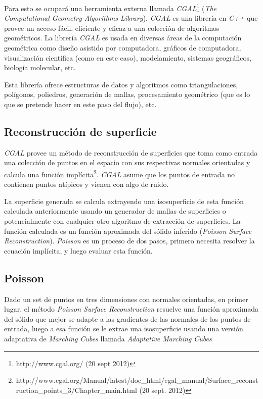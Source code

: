 Para esto se ocupará una herramienta externa llamada \emph{CGAL}\footnote{http://www.cgal.org/ (20 sept 2012)} (\emph{The Computational Geometry Algorithms Library}). \emph{CGAL} es una librería en \emph{C++} que provee un acceso fácil, eficiente y eficaz a una colección de algoritmos geométricos. La librería \emph{CGAL} es usada en diversas áreas de la computación geométrica como diseño asistido por computadora, gráficos de computadora, visualización científica (como en este caso), modelamiento, sistemas geográficos, biología molecular, etc.

Esta librería ofrece estructuras de datos y algoritmos como triangulaciones, polígonos, poliedros, generación de mallas, procesamiento geométrico (que es lo que se pretende hacer en este paso del flujo), etc.

\subsection{Reconstrucción de superficie}
\label{ch:propuesta:sec:refinamiento:reconstruccionDeSuperficie}

\emph{CGAL} provee un método de reconstrucción de superficies que toma como entrada una colección de puntos en el espacio con sus respectivas normales orientadas y calcula una función implícita\footnote{http://www.cgal.org/Manual/latest/doc\_html/cgal\_manual/Surface\_reconstruction\_points\_3/Chapter\_main.html (20 sept. 2012)}. \emph{CGAL} asume que los puntos de entrada no contienen puntos atípicos y vienen con algo de ruido.

La superficie generada se calcula extrayendo una isosuperficie de esta función calculada anteriormente usando un generador de mallas de superficies \cite{Rineau2007100} o potencialmente con cualquier otro algoritmo de extracción de superficies. La función calculada es un función aproximada del sólido inferido (\emph{Poisson Surface Reconstruction}). \emph{Poisson} es un proceso de dos pasos, primero necesita resolver la ecuación implícita, y luego evaluar esta función.

\subsection{Poisson}
\label{ch:propuesta:sec:refinamiento:poisson}

Dado un set de puntos en tres dimensiones con normales orientadas, en primer lugar, el método \emph{Poisson Surface Reconstruction} \cite{Kazhdan2006PoissonSurfaceReconstruction} resuelve una función aproximada del sólido que mejor se adapte a las gradientes de las normales de los puntos de entrada, luego a esa función se le extrae una isosuperficie usando una versión adaptativa de \emph{Marching Cubes} llamada \emph{Adaptative Marching Cubes} \cite{Shu95adaptivemarching}

